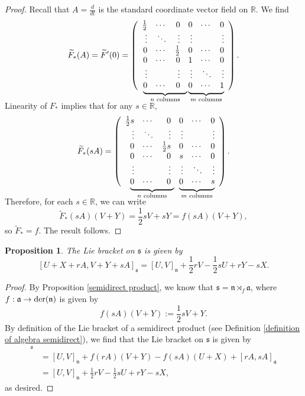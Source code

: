 \documentclass{amsart}
\newcommand{\R}{\mathbb R}
\newcommand{\der}{\text{\normalfont der}}
\newcommand{\s}{\mathfrak s}
\newcommand{\n}{\mathfrak n}
\renewcommand{\a}{\mathfrak a}
\theoremstyle{plain}
\newtheorem{proposition}[theorem]{Proposition}
\theoremstyle{definition}
\theoremstyle{remark}
\newcommand\undermat[2]{%
	\makebox[0pt][l]{$\smash{\underbrace{\phantom{%
					\begin{matrix}#2\end{matrix}}}_{\text{$#1$}}}$}#2}
\begin{document}
\begin{proof}
 		Recall that $A = \frac{d}{dt}$ is the standard coordinate vector field on $\R$. We find
 		$$ \widetilde F_*(A) =  \widetilde F'(0) = \left(\begin{array}{rrrrrr}
 			\frac12 &\cdots&0&0&\cdots&0 \\
 			\vdots& \ddots &\vdots&\vdots&&\vdots \\
 			0&\cdots& \frac12 &0&\cdots&0 \\
 			0&\cdots& 0& 1 &\cdots& 0\\
 			\vdots&&\vdots&\vdots& \ddots &\vdots \\
 			\undermat{n\text{ columns}}{0&\cdots&0 &} \undermat{m\text{ columns}}{0&\cdots& 1}
 		\end{array}\right).$$
 		\vspace{5mm} 
			
 		Linearity of $F_*$ implies that for any $s \in \R$,
 		$$\widetilde F_*(sA) = \left(\begin{array}{rrrrrr}
 			\frac12s &\cdots&0&0&\cdots&0 \\
 			\vdots& \ddots &\vdots&\vdots&&\vdots \\
 			0&\cdots& \frac12s &0&\cdots&0 \\
 			0&\cdots& 0& s &\cdots& 0\\
 			\vdots&&\vdots&\vdots& \ddots &\vdots \\
 			\undermat{n\text{ columns}}{0&\cdots&0 &} \undermat{m\text{ columns}}{0&\cdots& s}
 		\end{array}\right).$$
 		\vspace{5mm} 
 
 		Therefore, for each $s \in \R$, we can write 
 		$$\widetilde F_*(sA)(V+Y) = \frac12 s V + sY = f(sA)(V+Y),$$
 		so $\widetilde F_* = f$. The result follows.
	 \end{proof}
	 
	 \begin{proposition}
	 	\label{connection}
	 	The Lie bracket on $\s$ is given by 
	 	$$[U+X+rA,V+Y+sA]_\s = [U,V]_\n + \frac12 rV - \frac12 sU + rY - sX.$$
	 \end{proposition}
	 \begin{proof}
	 	By Proposition \ref{semidirect product}, we know that $\s = \n \rtimes_f \a$, where $f:\a \rightarrow \der(\n)$ is given by 
	 	$$f(sA) (V+Y) := \frac12 s V + Y.$$
	 	By definition of the Lie bracket of a semidirect product (see Definition \ref{definition of algebra semidirect}), we find that the Lie bracket on $\s$ is given by 
	 	\begin{align*}
	 		[&U+X+rA,V+Y+ sA]_\s \\&= [U,V]_\n + f(rA)(V+Y) - f(sA)(U+X) + [rA,sA]_\a \\
	 		&=[U,V]_\n + \frac12 rV - \frac12 sU + rY - sX,
	 	\end{align*}
 		as desired.
	 \end{proof}
 
\end{document}
